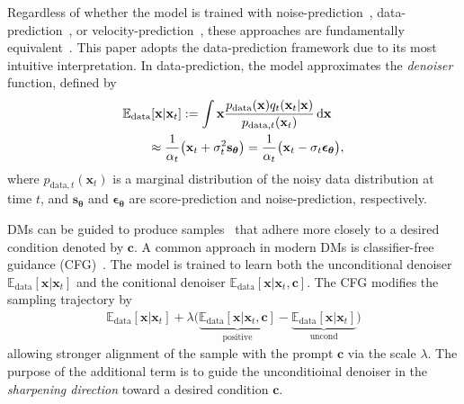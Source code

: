 Regardless of whether the model is trained with noise-prediction~\cite{ho2020denoising}, data-prediction~\cite{karras2022elucidating}, or velocity-prediction~\cite{salimans2022progressive,lipman2022flow}, these approaches are fundamentally equivalent~\cite{kingma2021variational,kim2021soft}. This paper adopts the data-prediction framework due to its most intuitive interpretation. In data-prediction, the model approximates the \textit{denoiser} function, defined by
\begin{align}\label{eq:E_data}
\begin{split}
&\mathbb{E}_{\text{data}}[\mathbf{x}\vert\mathbf{x}_{t}]:=\int \mathbf{x} \frac{p_{\text{data}}(\mathbf{x})q_{t}(\mathbf{x}_{t}\vert\mathbf{x})}{p_{\text{data},t}(\mathbf{x}_{t})}\mathop{}\!\mathrm{d}\mathbf{x}\\
&\quad\quad\approx\frac{1}{\alpha_{t}}\big(\mathbf{x}_{t}+\sigma_{t}^{2}\mathbf{s}_{\bm{\theta}}\big)=\frac{1}{\alpha_{t}}\big(\mathbf{x}_{t}-\sigma_{t}\bm{\epsilon}_{\bm{\theta}}\big), \end{split}
\end{align}
where $p_{\text{data},t}(\mathbf{x}_{t})$ is a marginal distribution of the noisy data distribution at time $t$, and $\mathbf{s}_{\bm{\theta}}$ and $\bm{\epsilon}_{\bm{\theta}}$ are score-prediction and noise-prediction, respectively.



DMs can be guided to produce samples~\cite{dhariwal2021diffusion,kim2022refining} that adhere more closely to a desired condition denoted by $\mathbf{c}$. A common approach in modern DMs is classifier-free guidance (CFG)~\cite{ho2021classifier}. The model is trained to learn both the unconditional denoiser $\mathbb{E}_{\text{data}}[\mathbf{x}\vert\mathbf{x}_{t}]$ and the conitional denoiser $\mathbb{E}_{\text{data}}[\mathbf{x}\vert\mathbf{x}_{t},\mathbf{c}]$. The CFG modifies the sampling trajectory by
\begin{align*}
%
    \mathbb{E}_{\text{data}}[\mathbf{x}\vert\mathbf{x}_{t}]+\lambda\big(\underbrace{\mathbb{E}_{\text{data}}[\mathbf{x}\vert\mathbf{x}_{t},\mathbf{c}]}_{\text{positive}}-\underbrace{\mathbb{E}_{\text{data}}[\mathbf{x}\vert\mathbf{x}_{t}]}_{\text{uncond}}\big)
\end{align*}
allowing stronger alignment of the sample with the prompt $\mathbf{c}$ via the scale $\lambda$. The purpose of the additional term is to guide the unconditioinal denoiser in the \textit{sharpening direction} toward a desired condition $\mathbf{c}$.

